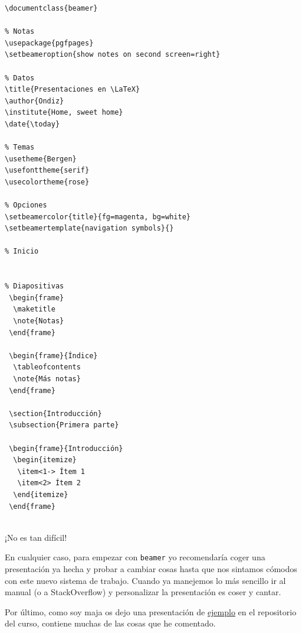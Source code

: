 \begin{lstlisting}[language={[latex]tex}]
% Definición
\documentclass{beamer}

% Notas
\usepackage{pgfpages}
\setbeameroption{show notes on second screen=right}

% Datos
\title{Presentaciones en \LaTeX}
\author{Ondiz}
\institute{Home, sweet home}
\date{\today}

% Temas
\usetheme{Bergen}
\usefonttheme{serif}
\usecolortheme{rose}

% Opciones
\setbeamercolor{title}{fg=magenta, bg=white}
\setbeamertemplate{navigation symbols}{}

% Inicio


% Diapositivas
 \begin{frame}
  \maketitle
  \note{Notas}
 \end{frame}
 
 \begin{frame}{Índice}
  \tableofcontents
  \note{Más notas}
 \end{frame}
 
 \section{Introducción}
 \subsection{Primera parte}

 \begin{frame}{Introducción}
  \begin{itemize}
   \item<1-> Ítem 1
   \item<2> Ítem 2
  \end{itemize}
 \end{frame}


\end{lstlisting}

¡No es tan difícil!

En cualquier caso, para empezar con \lstinline!beamer! yo recomendaría
coger una presentación ya hecha y probar a cambiar cosas hasta que nos
sintamos cómodos con este nuevo sistema de trabajo. Cuando ya manejemos
lo más sencillo ir al manual (o a StackOverflow) y personalizar la
presentación es coser y cantar.

Por último, como soy maja os dejo una presentación de
\href{https://github.com/Ondiz/cursoLatex/tree/master/Ejemplos/Presentacion}{ejemplo}
en el repositorio del curso, contiene muchas de las cosas que he
comentado.

